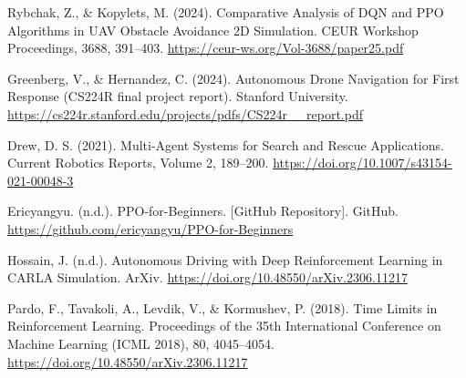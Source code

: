 \documentclass[12pt,a4paper]{article}
\begin{document}
\begin{thebibliography}{9}
Rybchak, Z., \& Kopylets, M.
(2024). 
Comparative Analysis of DQN and PPO Algorithms in UAV Obstacle Avoidance 2D Simulation. 
CEUR Workshop Proceedings, 3688, 391–403. 
\url{https://ceur-ws.org/Vol-3688/paper25.pdf}

Greenberg, V., \& Hernandez, C. 
(2024). 
Autonomous Drone Navigation for First Response (CS224R final project report). Stanford University. 
\url{https://cs224r.stanford.edu/projects/pdfs/CS224r__report.pdf}

Drew, D. S. 
(2021). 
Multi-Agent Systems for Search and Rescue Applications. 
Current Robotics Reports, Volume 2, 189–200. 
\url{https://doi.org/10.1007/s43154-021-00048-3}

Ericyangyu. 
(n.d.). 
PPO-for-Beginners. [GitHub Repository]. GitHub. 
\url{https://github.com/ericyangyu/PPO-for-Beginners}


Hossain, J. 
(n.d.). 
Autonomous Driving with Deep Reinforcement Learning in CARLA Simulation. 
ArXiv. 
\url{https://doi.org/10.48550/arXiv.2306.11217}


Pardo, F., Tavakoli, A., Levdik, V., \& Kormushev, P.
(2018). 
Time Limits in Reinforcement Learning. 
Proceedings of the 35th International Conference on Machine Learning (ICML 2018), 80, 4045–4054. 
\url{https://doi.org/10.48550/arXiv.2306.11217}

\end{thebibliography}
\end{document}
